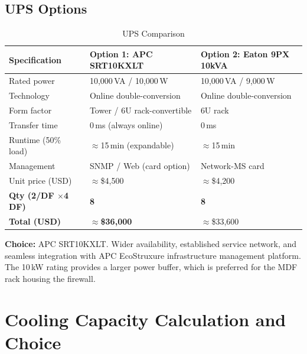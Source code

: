 \documentclass[12pt,a4paper]{report}
\begin{document}
\subsection{UPS Options}

\begin{table}[H]
  \centering
  \caption{UPS Comparison}
  \label{tab:ups_compare}
  \begin{tabular}{L{3.8cm} L{5.2cm} L{5.2cm}}
    \toprule
    \textbf{Specification} & \textbf{Option 1: APC SRT10KXLT} & \textbf{Option 2: Eaton 9PX 10kVA} \\
    \midrule
    Rated power            & 10{,}000\,VA / 10{,}000\,W         & 10{,}000\,VA / 9{,}000\,W \\
    Technology             & Online double-conversion            & Online double-conversion \\
    Form factor            & Tower / 6U rack-convertible         & 6U rack \\
    Transfer time          & 0\,ms (always online)               & 0\,ms \\
    Runtime (50\% load)    & $\approx$15\,min (expandable)       & $\approx$15\,min \\
    Management             & SNMP / Web (card option)            & Network-MS card \\
    Unit price (USD)       & $\approx$\$4{,}500                  & $\approx$\$4{,}200 \\
    \textbf{Qty (2/DF $\times$4 DF)} & \textbf{8} & \textbf{8} \\
    \textbf{Total (USD)}   & $\approx$\textbf{\$36{,}000}        & $\approx$\$33{,}600 \\
    \bottomrule
  \end{tabular}
\end{table}

\textbf{Choice:} APC SRT10KXLT.
Wider availability, established service network, and seamless integration
with APC EcoStruxure infrastructure management platform.
The 10\,kW rating provides a larger power buffer,
which is preferred for the MDF rack housing the firewall.

\section{Cooling Capacity Calculation and Choice}
\end{document}
